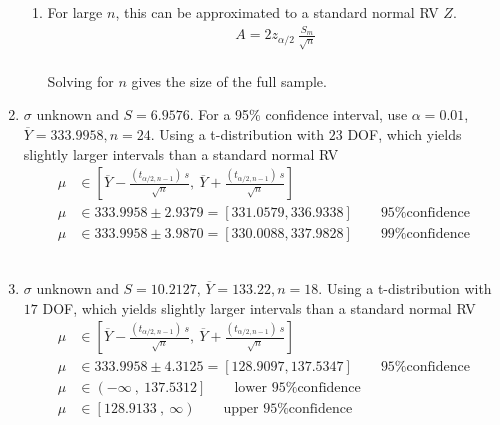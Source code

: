 \begin{enumerate}
\begin{enumerate}
			\item For large $ n $, this can be approximated to a standard normal RV $ Z $. \\
			\begin{align}
				A = 2z_{\alpha/2}\ \frac{S_m}{\sqrt{n}}
			\end{align} \\
			Solving for $ n $ gives the size of the full sample. \\
		\end{enumerate}
	
	
	\item $ \sigma $ unknown and $ S = 6.9576 $. For a 95\% confidence interval, use $ \alpha = 0.01 $, $ \overline{Y} = 333.9958, n = 24$. Using a t-distribution with $ 23 $ DOF, which yields slightly larger intervals than a standard normal RV\\
	
		\begin{align}
			\mu &\in \left[ \overline{Y} - \frac{(t_{\alpha/2, n-1})\ s}{\sqrt{n}}, \ \overline{Y} + \frac{(t_{\alpha/2, n-1})\ s}{\sqrt{n}} \right] \nonumber \\
			\mu &\in 333.9958 \pm 2.9379 = [331.0579, 336.9338] \qquad \text{95\% confidence} \nonumber \\
			\mu &\in 333.9958 \pm 3.9870 = [330.0088, 337.9828] \qquad \text{99\% confidence} 
		\end{align}\\
	
	
	\item $ \sigma $ unknown and $ S = 10.2127 $, $ \overline{Y} = 133.22, n = 18$. Using a t-distribution with $ 17 $ DOF, which yields slightly larger intervals than a standard normal RV\\
	
		\begin{align}
			\mu &\in \left[ \overline{Y} - \frac{(t_{\alpha/2, n-1})\ s}{\sqrt{n}}, \ \overline{Y} + \frac{(t_{\alpha/2, n-1})\ s}{\sqrt{n}} \right] \nonumber \\
			\mu &\in 333.9958 \pm 4.3125 = [128.9097, 137.5347] \qquad \text{95\% confidence} \nonumber \\
			\mu &\in \left(-\infty\ ,\  137.5312\right] \qquad \text{lower 95\% confidence} \nonumber \\
			\mu &\in \left[128.9133\ ,\ \infty\right) \qquad \text{upper 95\% confidence}
		\end{align}\\
	

\end{enumerate}
